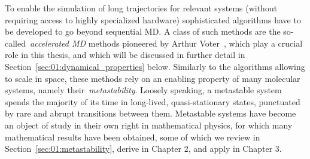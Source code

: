 To enable the simulation of long trajectories for relevant systems (without requiring access to highly specialized hardware) sophisticated algorithms have to be developed to go beyond sequential MD. A class of such methods are the so-called~\textit{accelerated MD} methods pioneered by Arthur Voter~\cite{V97,V98,SV00}, which play a crucial role in this thesis, and which will be discussed in further detail in Section~\ref{sec:01:dynamical_properties} below.
Similarly to the algorithms allowing to scale in space, these methods rely on an enabling property of many molecular systems, namely their~\textit{metastability}. Loosely speaking, a metastable system spends the majority of its time in long-lived, quasi-stationary states, punctuated by rare and abrupt transitions between them.
Metastable systems have become an object of study in their own right in mathematical physics, for which many mathematical results have been obtained, some of which we review in Section~\ref{sec:01:metastability}, derive in Chapter 2, and apply in Chapter 3.

